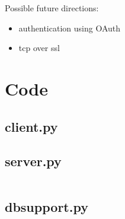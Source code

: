 \documentclass[a4paper,12pt]{article}
\begin{document}
Possible future directions:
\begin{itemize}
 \item authentication using OAuth
 \item tcp over ssl
\end{itemize}


\section{Code}

\subsection{client.py}
\begin{alltt}

\end{alltt}

\subsection{server.py}
\begin{verbatim}

\end{verbatim}

\subsection{dbsupport.py}
\begin{alltt}

\end{alltt}





% 
% 
% 
% 
% 
% 
\end{document}
